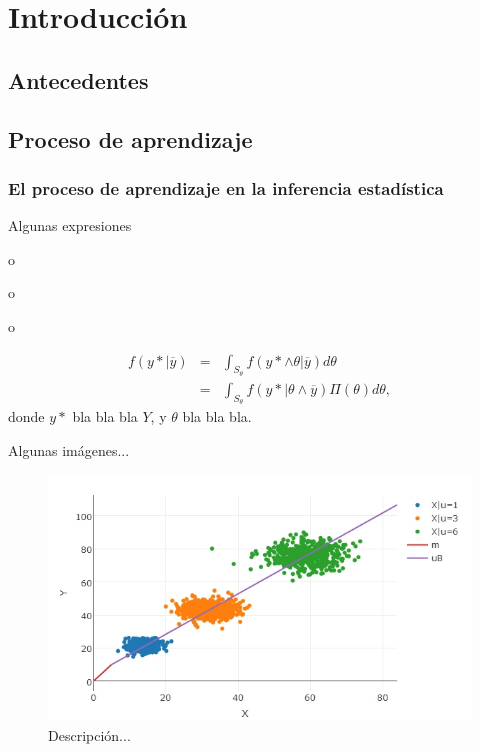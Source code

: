 \chapter{Introducci\'on}
 

\section{Antecedentes}

\section{Proceso de aprendizaje}  


\subsection{El proceso de aprendizaje en la inferencia estadística}

 Algunas expresiones \cite{AbramowitzStegun_Handbook}
 
 o 
 
 \citep{Amado}
 
 o
 
 \citeauthor{Bandorff_Nielsen}
 
 o 
 
 \cite{Pandey_Pulastya, Ross_Book}
 
 
\begin{eqnarray}
	f(y*|\overline{y})&=&\int_{S_{\theta}}f(y* \wedge \theta |\overline{y})d\theta\nonumber\\
	&=&\int_{S_{\theta}}f(y* | \theta \wedge \overline{y})\Pi(\theta) d\theta,
\end{eqnarray}  
donde $y*$ bla bla bla $Y$, y $\theta$ bla bla bla.

Algunas im\'agenes...

\begin{figure}
	\caption{Descripci\'on...}
	\includegraphics[scale=0.75]{Figuras/bm}
\end{figure}


